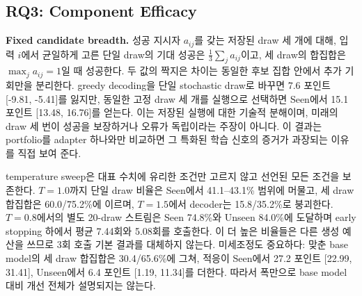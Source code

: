 \documentclass[10pt,conference]{IEEEtran}
\begin{document}
\subsection{RQ3: Component Efficacy}
\noindent\textbf{Fixed candidate breadth.} 성공 지시자 \(a_{ij}\)를 갖는 저장된 draw 세 개에 대해, 입력 \(i\)에서 균일하게 고른 단일 draw의 기대 성공은 \(\frac{1}{3}\sum_j a_{ij}\)이고, 세 draw의 합집합은 \(\max_j a_{ij}=1\)일 때 성공한다. 두 값의 짝지은 차이는 동일한 후보 집합 안에서 추가 기회만을 분리한다. greedy decoding을 단일 stochastic draw로 바꾸면 7.6 포인트 [-9.81, -5.41]를 잃지만, 동일한 고정 draw 세 개를 실행으로 선택하면 Seen에서 15.1 포인트 [13.48, 16.76]를 얻는다. 이는 저장된 실행에 대한 기술적 분해이며, 미래의 draw 세 번이 성공을 보장하거나 오류가 독립이라는 주장이 아니다. 이 결과는 portfolio를 adapter 하나와만 비교하면 그 특화된 학습 신호의 증거가 과장되는 이유를 직접 보여 준다.

temperature sweep은 대표 수치에 유리한 조건만 고르지 않고 선언된 모든 조건을 보존한다. \(T=1.0\)까지 단일 draw 비율은 Seen에서 41.1--43.1\% 범위에 머물고, 세 draw 합집합은 60.0/75.2\%에 이르며, \(T=1.5\)에서 decoder는 15.8/35.2\%로 붕괴한다. \(T=0.8\)에서의 별도 20-draw 스트림은 Seen 74.8\%와 Unseen 84.0\%에 도달하며 early stopping 하에서 평균 7.44회와 5.08회를 호출한다. 이 더 높은 비율들은 다른 생성 예산을 쓰므로 3회 호출 기본 결과를 대체하지 않는다. 미세조정도 중요하다: 맞춘 base model의 세 draw 합집합은 30.4/65.6\%에 그쳐, 적응이 Seen에서 27.2 포인트 [22.99, 31.41], Unseen에서 6.4 포인트 [1.19, 11.34]를 더한다. 따라서 폭만으로 base model 대비 개선 전체가 설명되지는 않는다.
\end{document}
